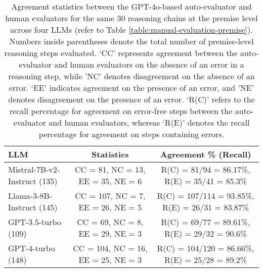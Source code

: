 \begin{table*}[!htbp]
\small
\centering
\begin{tabular}{lcc}
\toprule
LLM   & Statistics & Agreement \% (Recall) \\ 
\midrule
        Mistral-7B-v2-Instruct (135) & CC = 81, NC = 13, EE = 35, NE = 6 & R(C) = 81/94 = 86.17\%, R(E) = 35/41 = 85.3\% \\
        Llama-3-8B-Instruct (145) & 	CC = 107, NC = 7, EE = 26, NE = 5 & R(C) = 107/114 = 93.85\%, R(E) = 26/31 = 83.87\% \\
        GPT-3.5-turbo (109) & 	CC = 69, NC = 8, EE = 29, NE = 3 & R(C) = 69/77 = 89.61\%, R(E) = 29/32 = 90.6\% \\
        GPT-4-turbo (148) & CC = 104, NC = 16, EE = 25, NE = 3 & R(C) = 104/120 = 86.66\%, R(E) = 25/28 = 89.2\% \\
\bottomrule
\end{tabular}
\caption{Agreement statistics between the GPT-4o-based auto-evaluator and human evaluators for the same 30 reasoning chains at the premise level across four LLMs (refer to Table \ref{table:manual-evaluation-premise}). Numbers inside parentheses denote the total number of premise-level reasoning steps evaluated. `CC' represents agreement between the auto-evaluator and human evaluators on the absence of an error in a reasoning step, while 'NC' denotes disagreement on the absence of an error. `EE' indicates agreement on the presence of an error, and 'NE' denotes disagreement on the presence of an error. `R(C)' refers to the recall percentage for agreement on error-free steps between the auto-evaluator and human evaluators, whereas `R(E)' denotes the recall percentage for agreement on steps containing errors.}
\label{table:auto-eval-agreement-premise}
\end{table*}
